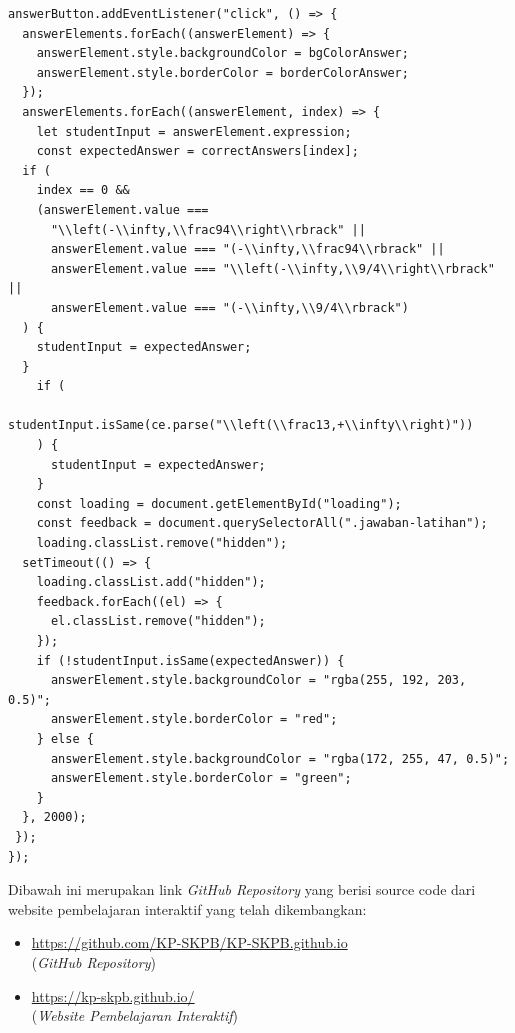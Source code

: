 \documentclass{file/KP-ITS}
\theoremstyle{definition}
\theoremstyle{definition}
\theoremstyle{plain}
\begin{document}
\begin{verbatim}
answerButton.addEventListener("click", () => {
  answerElements.forEach((answerElement) => {
    answerElement.style.backgroundColor = bgColorAnswer;
    answerElement.style.borderColor = borderColorAnswer;
  });
  answerElements.forEach((answerElement, index) => {
    let studentInput = answerElement.expression;
    const expectedAnswer = correctAnswers[index];
  if (
    index == 0 &&
    (answerElement.value ===
      "\\left(-\\infty,\\frac94\\right\\rbrack" ||
      answerElement.value === "(-\\infty,\\frac94\\rbrack" ||
      answerElement.value === "\\left(-\\infty,\\9/4\\right\\rbrack" ||
      answerElement.value === "(-\\infty,\\9/4\\rbrack")
  ) {
    studentInput = expectedAnswer;
  }
    if (
      studentInput.isSame(ce.parse("\\left(\\frac13,+\\infty\\right)"))
    ) {
      studentInput = expectedAnswer;
    }
    const loading = document.getElementById("loading");
    const feedback = document.querySelectorAll(".jawaban-latihan");
    loading.classList.remove("hidden");
  setTimeout(() => {
    loading.classList.add("hidden");
    feedback.forEach((el) => {
      el.classList.remove("hidden");
    });
    if (!studentInput.isSame(expectedAnswer)) {
      answerElement.style.backgroundColor = "rgba(255, 192, 203, 0.5)";
      answerElement.style.borderColor = "red";
    } else {
      answerElement.style.backgroundColor = "rgba(172, 255, 47, 0.5)";
      answerElement.style.borderColor = "green";
    }
  }, 2000);
 });
});
\end{verbatim}
\cleardoublepage
{}
Dibawah ini merupakan link \textit{GitHub Repository} yang berisi source code dari website pembelajaran interaktif yang telah dikembangkan:
\begin{itemize}
  \item \url{https://github.com/KP-SKPB/KP-SKPB.github.io} \\(\textit{GitHub Repository})
  \item \url{https://kp-skpb.github.io/} \\(\textit{Website Pembelajaran Interaktif})
\end{itemize}
\end{document}
